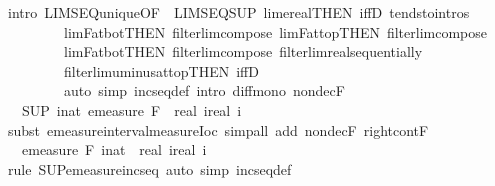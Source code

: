 \documentclass{article}
\theoremstyle{definition}
\begin{document}
\begin{isabellebody}
\ {\isacharparenleft}intro\ LIMSEQ{\isacharunderscore}unique{\isacharbrackleft}OF\ {\isacharunderscore}\ LIMSEQ{\isacharunderscore}SUP{\isacharbrackright}\ lim{\isacharunderscore}ereal{\isacharbrackleft}THEN\ iffD{}{\isacharbrackright}\ tendsto{\isacharunderscore}intros\isanewline
\ \ \ \ \ \ \ \ \ lim{\isacharunderscore}F{\isacharunderscore}at{\isacharunderscore}bot{\isacharbrackleft}THEN\ filterlim{\isacharunderscore}compose{\isacharbrackright}\ lim{\isacharunderscore}F{\isacharunderscore}at{\isacharunderscore}top{\isacharbrackleft}THEN\ filterlim{\isacharunderscore}compose{\isacharbrackright}\isanewline
\ \ \ \ \ \ \ \ \ lim{\isacharunderscore}F{\isacharunderscore}at{\isacharunderscore}bot{\isacharbrackleft}THEN\ filterlim{\isacharunderscore}compose{\isacharbrackright}\ filterlim{\isacharunderscore}real{\isacharunderscore}sequentially\isanewline
\ \ \ \ \ \ \ \ \ filterlim{\isacharunderscore}uminus{\isacharunderscore}at{\isacharunderscore}top{\isacharbrackleft}THEN\ iffD{}{\isacharbrackright}{\isacharparenright}\isanewline
\ \ \ \ \ \ \ \ \ {\isacharparenleft}auto\ simp{\isacharcolon}\ incseq{\isacharunderscore}def\ intro{\isacharbang}{\isacharcolon}\ diff{\isacharunderscore}mono\ nondecF{\isacharparenright}\isanewline
\ \ \ \ \isamarkupfalse%
\ \isamarkupfalse%
\ {\isachardoublequoteopen}{\isasymdots}\ {\isacharequal}\ {\isacharparenleft}SUP\ i{\isacharcolon}{\isacharcolon}nat{\isachardot}\ emeasure\ {\isacharquery}F\ {\isacharbraceleft}{\isacharminus}\ real\ i{\isacharless}{\isachardot}{\isachardot}real\ i{\isacharbraceright}{\isacharparenright}{\isachardoublequoteclose}\isanewline
\ \ \ \ \ \ \isamarkupfalse%
\ {\isacharparenleft}subst\ emeasure{\isacharunderscore}interval{\isacharunderscore}measure{\isacharunderscore}Ioc{\isacharparenright}\ {\isacharparenleft}simp{\isacharunderscore}all\ add{\isacharcolon}\ nondecF\ right{\isacharunderscore}cont{\isacharunderscore}F{\isacharparenright}\isanewline
\ \ \ \ \isamarkupfalse%
\ \isamarkupfalse%
\ {\isachardoublequoteopen}{\isasymdots}\ {\isacharequal}\ emeasure\ {\isacharquery}F\ {\isacharparenleft}{\isasymUnion}i{\isacharcolon}{\isacharcolon}nat{\isachardot}\ {\isacharbraceleft}{\isacharminus}\ real\ i{\isacharless}{\isachardot}{\isachardot}real\ i{\isacharbraceright}{\isacharparenright}{\isachardoublequoteclose}\isanewline
\ \ \ \ \ \ \isamarkupfalse%
\ {\isacharparenleft}rule\ SUP{\isacharunderscore}emeasure{\isacharunderscore}incseq{\isacharparenright}\ {\isacharparenleft}auto\ simp{\isacharcolon}\ incseq{\isacharunderscore}def{\isacharparenright}\isanewline

\end{isabellebody}
\end{document}

